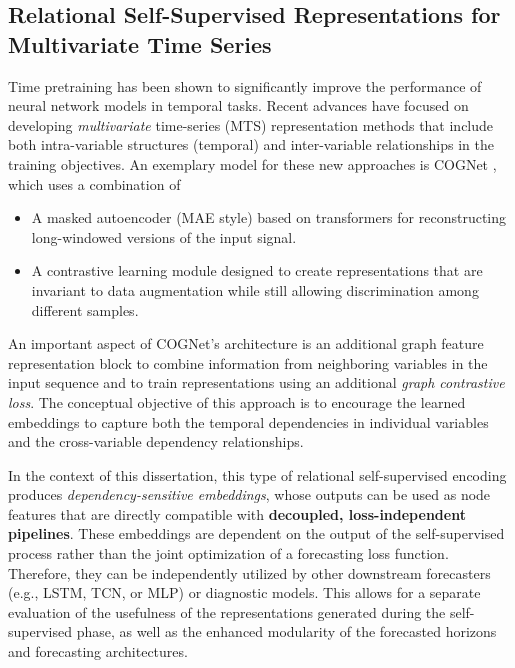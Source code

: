 \subsection{Relational Self-Supervised Representations for Multivariate Time Series}

\label{subsec:relational_ssl_mts}

Time pretraining has been shown to significantly improve the performance of neural network models in temporal tasks. Recent advances have focused on developing \emph{multivariate} time-series (\acs{MTS}) representation methods that include both intra-variable structures (temporal) and inter-variable relationships in the training objectives. An exemplary model for these new approaches is COGNet \cite{wang2024cognet}, which uses a combination of

\begin{itemize}

    \item[(i)] A masked autoencoder (MAE style) based on transformers for reconstructing long-windowed versions of the input signal. 

    \item[(ii)] A contrastive learning module designed to create representations that are invariant to data augmentation while still allowing discrimination among different samples.

\end{itemize}

An important aspect of COGNet's architecture is an additional graph feature representation block to combine information from neighboring variables in the input sequence and to train representations using an additional \emph{graph contrastive loss}. The conceptual objective of this approach is to encourage the learned embeddings to capture both the temporal dependencies in individual variables and the cross-variable dependency relationships.

In the context of this dissertation, this type of relational self-supervised encoding produces \emph{dependency-sensitive embeddings}, whose outputs can be used as node features that are directly compatible with \textbf{decoupled, loss-independent pipelines}. These embeddings are dependent on the output of the self-supervised process rather than the joint optimization of a forecasting loss function. Therefore, they can be independently utilized by other downstream forecasters (e.g., \ac{LSTM}, \ac{TCN}, or \ac{MLP}) or diagnostic models. This allows for a separate evaluation of the usefulness of the representations generated during the self-supervised phase, as well as the enhanced modularity of the forecasted horizons and forecasting architectures.

